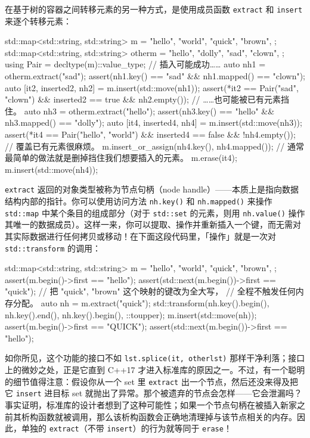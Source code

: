 在基于树的容器之间转移元素的另一种方式，是使用成员函数 \texttt{extract} 和 \texttt{insert} 来逐个转移元素：

\begin{codebox}[cpp]
    std::map<std::string, std::string> m = {
      {"hello", "world"},
      {"quick", "brown"},
    };
    std::map<std::string, std::string> otherm = {
      {"hello", "dolly"},
      {"sad", "clown"},
    };
    using Pair = decltype(m)::value_type;
    // 插入可能成功……
    auto nh1 = otherm.extract("sad");
    assert(nh1.key() == "sad" && nh1.mapped() == "clown");
    auto [it2, inserted2, nh2] = m.insert(std::move(nh1));
    assert(*it2 == Pair("sad", "clown") && inserted2 == true &&
    nh2.empty());
    // ……也可能被已有元素挡住。
    auto nh3 = otherm.extract("hello");
    assert(nh3.key() == "hello" && nh3.mapped() == "dolly");
    auto [it4, inserted4, nh4] = m.insert(std::move(nh3));
    assert(*it4 == Pair("hello", "world") && inserted4 == false &&
    !nh4.empty());
    // 覆盖已有元素很麻烦。
    m.insert_or_assign(nh4.key(), nh4.mapped());
    // 通常最简单的做法就是删掉挡住我们想要插入的元素。
    m.erase(it4);
    m.insert(std::move(nh4));
\end{codebox}

\texttt{extract} 返回的对象类型被称为节点句柄（node handle）——本质上是指向数据结构内部的指针。你可以使用访问方法 \texttt{nh.\allowbreak{}key(\allowbreak{})\allowbreak{}} 和 \texttt{nh.\allowbreak{}mapped(\allowbreak{})\allowbreak{}} 来操作 \texttt{std::\allowbreak{}map} 中某个条目的组成部分（对于 \texttt{std::\allowbreak{}set} 的元素，则用 \texttt{nh.\allowbreak{}value(\allowbreak{})\allowbreak{}} 操作其唯一的数据成员）。这样一来，你可以提取、操作并重新插入一个键，而无需对其实际数据进行任何拷贝或移动！在下面这段代码里，「操作」就是一次对 \texttt{std::\allowbreak{}transform} 的调用：

\begin{codebox}[cpp]
    std::map<std::string, std::string> m = {
      {"hello", "world"},
      {"quick", "brown"},
    };
    assert(m.begin()->first == "hello");
    assert(std::next(m.begin())->first == "quick");
    // 把 {"quick", "brown"} 这个映射的键改为全大写，
    // 全程不触发任何内存分配。
    auto nh = m.extract("quick");
    std::transform(nh.key().begin(), nh.key().end(), nh.key().begin(),
    ::toupper);
    m.insert(std::move(nh));
    assert(m.begin()->first == "QUICK");
    assert(std::next(m.begin())->first == "hello");
\end{codebox}

如你所见，这个功能的接口不如 \texttt{lst.\allowbreak{}splice(\allowbreak{}it,\allowbreak{}\ otherlst)\allowbreak{}} 那样干净利落；接口上的微妙之处，正是它直到 C++17 才进入标准库的原因之一。不过，有一个聪明的细节值得注意：假设你从一个 set 里 \texttt{extract} 出一个节点，然后还没来得及把它 \texttt{insert} 进目标 set 就抛出了异常。那个被遗弃的节点会怎样——它会泄漏吗？事实证明，标准库的设计者想到了这种可能性；如果一个节点句柄在被插入新家之前其析构函数就被调用，那么该析构函数会正确地清理掉与该节点相关的内存。因此，单独的 \texttt{extract}（不带 \texttt{insert}）的行为就等同于 \texttt{erase}！

